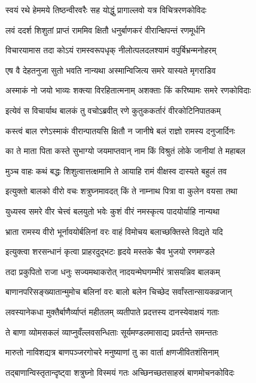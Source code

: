 \twolineshloka
{स्वयं रथे हेममये तिष्ठन्वीरवरैः सह}
{योद्धुं प्रागाल्लवो यत्र विचित्ररणकोविदः}%

\twolineshloka
{लवं ददर्श शिशुतां प्राप्तं राममिव क्षितौ}
{धनुर्बाणकरं वीरान्क्षिपन्तं रणमूर्धनि}%

\twolineshloka
{विचारयामास तदा कोऽयं रामस्वरूपधृक्}
{नीलोत्पलदलश्यामं वपुर्बिभ्रन्मनोहरम्}%

\twolineshloka
{एष वै देहतनुजा सुतो भवति नान्यथा}
{अस्मान्विजित्य समरे यास्यते मृगराडिव}%

\twolineshloka
{अस्माकं नो जयो भाव्यः शक्त्या विरहितात्मनाम्}
{अशक्ताः किं करिष्यामः समरे रणकोविदाः}%

\twolineshloka
{इत्येवं स विचार्याथ बालकं तु वचोऽब्रवीत्}
{रणे कुतुककर्तारं वीरकोटिनिपातकम्}%

\twolineshloka
{कस्त्वं बाल रणेऽस्माकं वीरान्पातयसि क्षितौ}
{न जानीषे बलं राज्ञो रामस्य दनुजार्दिनः}%

\twolineshloka
{का ते माता पिता कस्ते सुभाग्यो जयमाप्तवान्}
{नाम किं विश्रुतं लोके जानीयां ते महाबल}%

\twolineshloka
{मुञ्च वाहः कथं बद्धः शिशुत्वात्तत्क्षमामि ते}
{आयाहि रामं वीक्षस्व दास्यते बहुलं तव}%

\twolineshloka
{इत्युक्तो बालको वीरो वचः शत्रुघ्नमावदत्}
{किं ते नाम्नाथ पित्रा वा कुलेन वयसा तथा}%

\twolineshloka
{युध्यस्व समरे वीर चेत्त्वं बलयुतो भवेः}
{कुशं वीरं नमस्कृत्य पादयोर्याहि नान्यथा}%

\twolineshloka
{भ्राता रामस्य वीरो भूर्नावयोर्बलिनां वरः}
{वाहं विमोचय बलाच्छक्तिस्ते विद्यते यदि}%

\twolineshloka
{इत्युक्त्वा शरसन्धानं कृत्वा प्राहरदुद्भटः}
{हृदये मस्तके चैव भुजयो रणमण्डले}%

\twolineshloka
{तदा प्रकुपितो राजा धनुः सज्यमथाकरोत्}
{नादयन्मेघगम्भीरं त्रासयन्निव बालकम्}%

\twolineshloka
{बाणानपरिसङ्ख्यातान्मुमोच बलिनां वरः}
{बालो बलेन चिच्छेद सर्वांस्तान्सायकव्रजान्}%

\twolineshloka
{लवस्यानेकधा मुक्तैर्बाणैर्व्याप्तं महीतलम्}
{व्यतीपाते प्रदत्तस्य दानस्येवाक्षयं गताः}%

\twolineshloka
{ते बाणा व्योमसकलं व्याप्नुवँल्लवसन्धिताः}
{सूर्यमण्डलमासाद्य प्रवर्तन्ते समन्ततः}%

\twolineshloka
{मारुतो नाविशद्यत्र बाणपञ्जरगोचरे}
{मनुष्याणां तु का वार्ता क्षणजीवितशंसिनाम्}%

\twolineshloka
{तद्बाणान्विस्तृतान्दृष्ट्वा शत्रुघ्नो विस्मयं गतः}
{अच्छिनच्छतसाहस्रं बाणमोचनकोविदः}%


